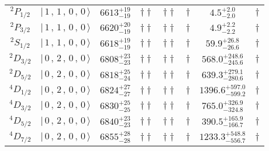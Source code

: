 \begin{tabular}{c| c c c c c c c}
$^{2}P_{1/2}$ & $\vert \,1\,,\,1\,,\,0\,,\,0 \,\rangle $ & $6613^{+19}_{-19}$ & $\dagger\dagger$ & $\dagger\dagger$ & $\dagger$ & $4.5^{+2.0}_{-2.0}$ & $\dagger$ \\ 
$^{2}P_{3/2}$ & $\vert \,1\,,\,1\,,\,0\,,\,0 \,\rangle $ & $6620^{+20}_{-19}$ & $\dagger\dagger$ & $\dagger\dagger$ & $\dagger$ & $4.9^{+2.2}_{-2.2}$ & $\dagger$ \\ 
$^{2}S_{1/2}$ & $\vert \,1\,,\,1\,,\,0\,,\,0 \,\rangle $ & $6618^{+19}_{-19}$ & $\dagger\dagger$ & $\dagger\dagger$ & $\dagger$ & $59.9^{+26.8}_{-26.6}$ & $\dagger$ \\ 
$^{2}D_{3/2}$ & $\vert \,0\,,\,2\,,\,0\,,\,0 \,\rangle $ & $6808^{+23}_{-23}$ & $\dagger\dagger$ & $\dagger\dagger$ & $\dagger$ & $568.0^{+248.6}_{-245.6}$ & $\dagger$ \\ 
$^{2}D_{5/2}$ & $\vert \,0\,,\,2\,,\,0\,,\,0 \,\rangle $ & $6818^{+25}_{-24}$ & $\dagger\dagger$ & $\dagger\dagger$ & $\dagger$ & $639.3^{+279.1}_{-280.6}$ & $\dagger$ \\ 
$^{4}D_{1/2}$ & $\vert \,0\,,\,2\,,\,0\,,\,0 \,\rangle $ & $6824^{+27}_{-27}$ & $\dagger\dagger$ & $\dagger\dagger$ & $\dagger$ & $1396.6^{+597.0}_{-599.2}$ & $\dagger$ \\ 
$^{4}D_{3/2}$ & $\vert \,0\,,\,2\,,\,0\,,\,0 \,\rangle $ & $6830^{+25}_{-25}$ & $\dagger\dagger$ & $\dagger\dagger$ & $\dagger$ & $765.0^{+326.9}_{-324.8}$ & $\dagger$ \\ 
$^{4}D_{5/2}$ & $\vert \,0\,,\,2\,,\,0\,,\,0 \,\rangle $ & $6840^{+23}_{-23}$ & $\dagger\dagger$ & $\dagger\dagger$ & $\dagger$ & $390.5^{+165.9}_{-166.7}$ & $\dagger$ \\ 
$^{4}D_{7/2}$ & $\vert \,0\,,\,2\,,\,0\,,\,0 \,\rangle $ & $6855^{+28}_{-28}$ & $\dagger\dagger$ & $\dagger\dagger$ & $\dagger$ & $1233.3^{+548.8}_{-556.7}$ & $\dagger$ \\ 
\hline \hline
\end{tabular}
